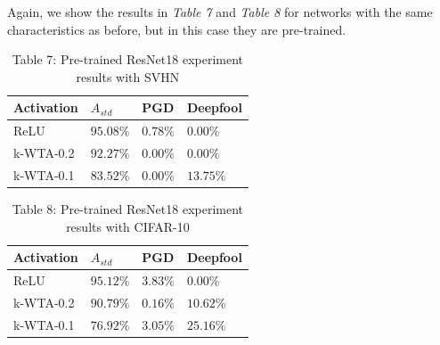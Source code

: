 \documentclass[a4paper]{article}
\begin{document}
	Again, we show the results in \textit{Table 7} and \textit{Table 8} for networks with the same characteristics as before, but in this case they are pre-trained.
	\begin{table}[!htbp]
		\begin{tabular}{|p{}|p{}|p{}|p{}|}
			\hline
			Activation	& $A_{std}$	&	PGD	&	Deepfool	\\
			\hline
			ReLU		&$95.08\%$&$0.78\%$&$0.00\%$	\\
			\hline
			k-WTA-0.2	&$92.27\%$&$0.00\%$&$0.00\%$	\\
			\hline
			k-WTA-0.1	&$83.52\%$&$0.00\%$&$13.75\%$	\\
			\hline
		\end{tabular}
		\caption{Table 7: Pre-trained ResNet18 experiment results with SVHN}\label{pre-resnetSVHN}
	\end{table}
	\begin{table}[!htbp]
		\begin{tabular}{|p{}|p{}|p{}|p{}|}
			\hline
			Activation	& $A_{std}$	&	PGD	&	Deepfool	\\
			\hline
			ReLU		&$95.12\%$&$3.83\%$&$0.00\%$	\\
			\hline
			k-WTA-0.2	&$90.79\%$&$0.16\%$&$10.62\%$	\\
			\hline
			k-WTA-0.1	&$76.92\%$&$3.05\%$&$25.16\%$	\\
			\hline
		\end{tabular}
		\caption{Table 8: Pre-trained ResNet18 experiment results with CIFAR-10}\label{pre-resnetCIFAR10}
	\end{table}
\end{document}
